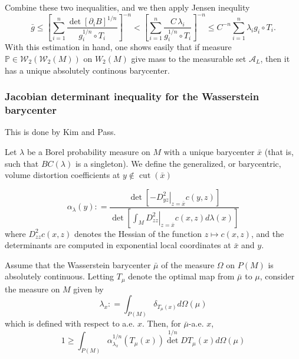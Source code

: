 Combine these two inequalities, and we then apply Jensen inequlity
\[
	\bar{g} \leq
	\left[ \sum_{i=1}^n \frac{\det[\partial_i B]^{1/n}}
	{g_i^{1/n} \circ T_i}\right]^{-n}
	< \left[ \sum_{i=1}^n \frac{C \, \lambda_i}
	{g_i^{1/n} \circ T_i}\right]^{-n}
	\leq C^{-n} \sum_{i=1}^n \lambda_i g_i \circ T_i.
\]
With this estimation in hand,
one shows easily that if measure $\mathbb{P} \in \mathcal{W}_2(\mathcal{W}_2(M))$ on $W_2(M)$ give mass to the measurable set $\mathcal{A}_L$,
then it has a unique absolutely continous barycenter.

\subsubsection{Jacobian determinant inequality for the Wasserstein barycenter}

This is done by Kim and Pass.
\begin{defn}
	Let \( \lambda \) be a Borel probability measure on \( M \) with a
	unique barycenter \( \bar { x } \) (that is, such that \( B C ( \lambda ) \) is a singleton). We define the generalized,
	or barycentric, volume distortion coefficients at \( y \notin \operatorname { cut } ( \bar { x } ) \)

	\[ \alpha _ { \lambda } ( y ) : = \frac { \operatorname { det } \left[ - \left. D _ { y z } ^ { 2 } \right| _ { z = \bar { x } } c ( y , z ) \right] } { \operatorname { det } \left[ \left. \int _ { M } D _ { z z } ^ { 2 } \right| _ { z = \bar { x } } c ( x , z ) d \lambda ( x ) \right] } \]
	where \( D _ { z z } ^ { 2 } c ( x , z ) \) denotes the Hessian of the function \( z \mapsto c ( x , z ) \), and the determinants
	are computed in exponential local coordinates at \( \bar { x } \) and \( y . \)
\end{defn}

\begin{thm}
	Assume that the Wasserstein barycenter \( \bar { \mu } \) of the measure \( \Omega \) on \( P ( M ) \) is absolutely continuous.
	Letting \( T _ { \mu } \) denote the optimal map from \( \bar { \mu } \) to \( \mu \), consider the measure on \( M \) given by
	\[ \lambda _ { x } : = \int _ { P ( M ) } \delta _ { T _ { \mu } ( x ) } d \Omega ( \mu ) \]
	which is defined with respect to a.e. $x$.
	Then, for \( \bar { \mu } \)-a.e. \(x\),
	\[ 1 \geq \int _ { P ( M ) } \alpha _ { \lambda _ { x } } ^ { 1 / n } \left( T _ { \mu } ( x ) \right) \operatorname { det } ^ { 1 / n } D T _ { \mu } ( x ) d \Omega ( \mu ) \]
\end{thm}

